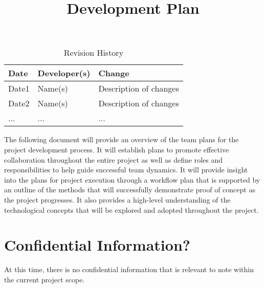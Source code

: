 \documentclass{article}
\title{Development Plan\\\progname}
\author{\authname}
\date{}
\begin{document}
\maketitle

\begin{table}[hp]
\caption{Revision History} \label{TblRevisionHistory}
\begin{tabularx}{\textwidth}{llX}
\toprule
\textbf{Date} & \textbf{Developer(s)} & \textbf{Change}\\
\midrule
Date1 & Name(s) & Description of changes\\
Date2 & Name(s) & Description of changes\\
... & ... & ...\\
\bottomrule
\end{tabularx}
\end{table}

\newpage{}

\iffalse
\wss{Put your introductory blurb here.  Often the blurb is a brief roadmap of
what is contained in the report.}

\wss{Additional information on the development plan can be found in the
\href{https://gitlab.cas.mcmaster.ca/courses/capstone/-/blob/main/Lectures/L02b_POCAndDevPlan/POCAndDevPlan.pdf?ref_type=heads}
{lecture slides}.}
\fi

The following document will provide an overview of the team plans for the project development process. It will
establish plans to promote effective collaboration throughout the entire project as well as define roles and
responsibilities to help guide successful team dynamics. It will provide insight into the plans for project
execution through a workflow plan that is supported by an outline of the methods that will successfully demonstrate
proof of concept as the project progresses. It also provides a high-level understanding of the technological
concepts that will be explored and adopted throughout the project.

\section{Confidential Information?}

\iffalse
\wss{State whether your project has confidential information from industry, or
not.  If there is confidential information, point to the agreement you have in
place.}\\
\fi

At this time, there is no confidential information that is relevant to note within the current project scope.
\end{document}
